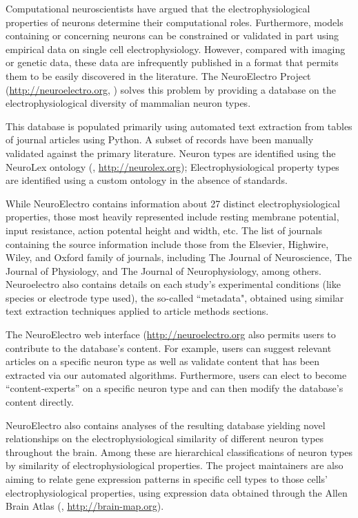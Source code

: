 \documentclass[12pt]{article}
\begin{document}
Computational neuroscientists have argued that the electrophysiological properties of neurons determine their computational roles.  
Furthermore, models containing or concerning neurons can be constrained or validated in part using empirical data on single cell electrophysiology.  
However, compared with imaging or genetic data, these data are infrequently published in a format that permits them to be easily discovered in the literature.  
The NeuroElectro Project (\url{http://neuroelectro.org}, \cite{neuroelectro_2013}) solves this problem by providing a database on the electrophysiological diversity of mammalian neuron types. 

This database is populated primarily using automated text extraction from tables of journal articles using Python.  
A subset of records have been manually validated against the primary literature.  
Neuron types are identified using the NeuroLex ontology (\cite{larson_neurolex.org:_2013}, \url{http://neurolex.org}); 
Electrophysiological property types are identified using a custom ontology in the absence of standards.  

While NeuroElectro contains information about 27 distinct electrophysiological properties, those most heavily represented include resting membrane potential, input resistance, action potental height and width, etc.  
The list of journals containing the source information include those from the Elsevier, Highwire, Wiley, and Oxford family of journals, including The Journal of Neuroscience, The Journal of Physiology, and The Journal of Neurophysiology, among others.  
Neuroelectro also contains details on each study’s experimental conditions (like species or electrode type used), the so-called ``metadata", obtained using similar text extraction techniques applied to article methods sections. 

The NeuroElectro web interface (\url{http://neuroelectro.org} also permits users to contribute to the database’s content. 
For example, users can suggest relevant articles on a specific neuron type as well as validate content that has been extracted via our automated algorithms. 
Furthermore, users can elect to become “content-experts” on a specific neuron type and can then modify the database’s content directly.

NeuroElectro also contains analyses of the resulting database yielding novel relationships on the electrophysiological similarity of different neuron types throughout the brain. 
Among these are hierarchical classifications of neuron types by similarity of electrophysiological properties.  
The project maintainers are also aiming to relate gene expression patterns in specific cell types to those cells' electrophysiological properties, using expression data obtained through the Allen Brain Atlas (\cite{lein_genome-wide_2007}, \url{http://brain-map.org}).  


\end{document}
